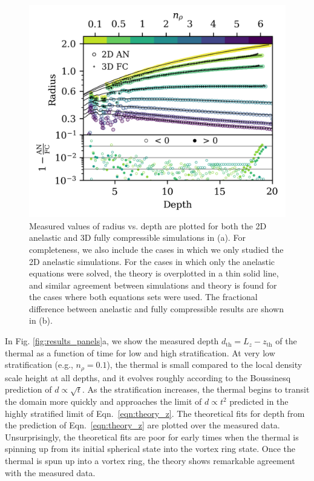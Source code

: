\documentclass[twocolumn, amsmath, amsfonts, amssymb, trackchanges]{aastex62}
\begin{document}
\begin{figure}[t!]
    \includegraphics[width=\columnwidth]{diff_AN_FC.png}
    \caption{
	Measured values of radius vs. depth are plotted for both the 2D anelastic and 3D fully compressible simulations in (a). 
	For completeness, we also include the cases in which we only studied the 2D anelastic simulations.
	For the cases in which only the anelastic equations were solved, the theory is overplotted in a thin solid line, and similar agreement between simulations and theory is found for the cases where both equations sets were used.
	The fractional difference between anelastic and fully compressible results are shown in (b).
    \label{fig:diff} }
\end{figure}

In Fig. \ref{fig:results_panels}a, we show the measured depth $d_{\text{th}} = L_z - z_{\text{th}}$ of the thermal as a function of time for low and high stratification. 
At very low stratification (e.g., $n_\rho = 0.1$), the thermal is small compared to the local density scale height at all depths, and it evolves roughly according to the Boussinesq prediction of $d \propto \sqrt{t}$. 
As the stratification increases, the thermal begins to transit the domain more quickly and approaches the limit of $d \propto t^2$ predicted in the highly stratified limit of Eqn.~\ref{eqn:theory_z}. 
The theoretical fits for depth from the prediction of Eqn.~\ref{eqn:theory_z} are plotted over the measured data.
Unsurprisingly, the theoretical fits are poor for early times when the thermal is spinning up from its initial spherical state into the vortex ring state.
Once the thermal is spun up into a vortex ring, the theory shows remarkable agreement with the measured data.
\end{document}

